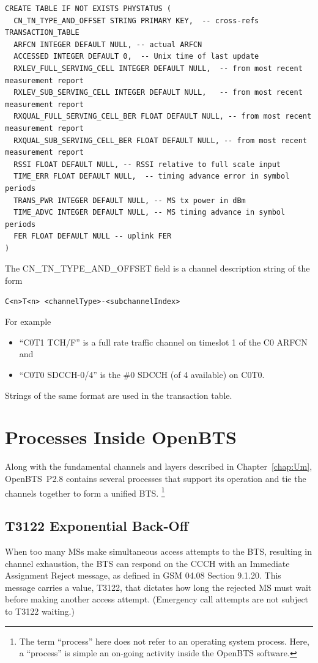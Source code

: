 \documentclass[11pt,openany]{book}
\begin{document}
\begin{verbatim}
CREATE TABLE IF NOT EXISTS PHYSTATUS (
  CN_TN_TYPE_AND_OFFSET STRING PRIMARY KEY,  -- cross-refs TRANSACTION_TABLE
  ARFCN INTEGER DEFAULT NULL, -- actual ARFCN
  ACCESSED INTEGER DEFAULT 0,  -- Unix time of last update
  RXLEV_FULL_SERVING_CELL INTEGER DEFAULT NULL,  -- from most recent measurement report
  RXLEV_SUB_SERVING_CELL INTEGER DEFAULT NULL,   -- from most recent measurement report
  RXQUAL_FULL_SERVING_CELL_BER FLOAT DEFAULT NULL, -- from most recent measurement report
  RXQUAL_SUB_SERVING_CELL_BER FLOAT DEFAULT NULL, -- from most recent measurement report
  RSSI FLOAT DEFAULT NULL, -- RSSI relative to full scale input
  TIME_ERR FLOAT DEFAULT NULL,  -- timing advance error in symbol periods
  TRANS_PWR INTEGER DEFAULT NULL, -- MS tx power in dBm
  TIME_ADVC INTEGER DEFAULT NULL, -- MS timing advance in symbol periods
  FER FLOAT DEFAULT NULL -- uplink FER
)
\end{verbatim}

The CN\_TN\_TYPE\_AND\_OFFSET field is a channel description string of the form
\begin{verbatim}
C<n>T<n> <channelType>-<subchannelIndex>
\end{verbatim}
For example
\begin{itemize}
	\item ``C0T1 TCH/F'' is a full rate traffic channel on timeslot 1 of the C0 ARFCN and 
	\item ``C0T0 SDCCH-0/4'' is the \#0 SDCCH (of 4 available) on C0T0.
\end{itemize}
Strings of the same format are used in the transaction table.

 

\chapter{Processes Inside OpenBTS}
\label{chap:inside}
Along with the fundamental channels and layers described in Chapter~\ref{chap:Um}, OpenBTS~P2.8 contains several processes that support its operation and tie the channels together to form a unified BTS.%
\footnote{The term ``process'' here does not refer to an operating system process.  Here, a ``process'' is simple an on-going activity inside the OpenBTS software.}


\section{T3122 Exponential Back-Off}
\label{sec:T3122}
When too many MSs make simultaneous access attempts to the BTS, resulting in channel exhaustion, the BTS can respond on the CCCH with an Immediate Assignment Reject message, as defined in GSM 04.08 Section 9.1.20.
This message carries a value, T3122, that dictates how long the rejected MS must wait before making another access attempt. (Emergency call attempts are not subject to T3122 waiting.)
\end{document}
